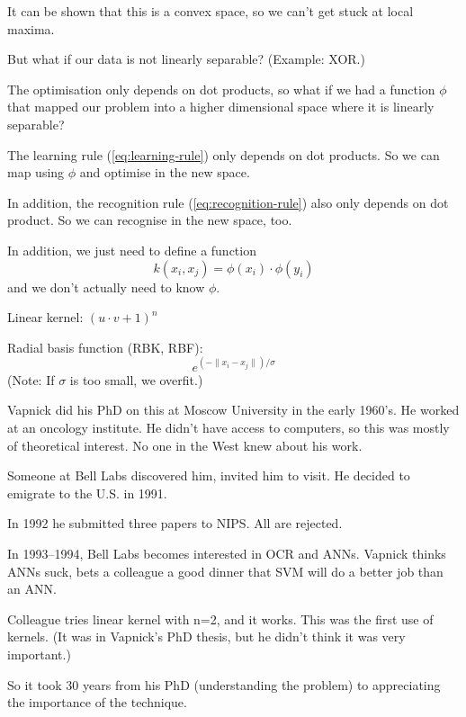 It can be shown that this is a convex space, so we can't get stuck at
local maxima.



But what if our data is not linearly separable?  (Example: XOR.)

The optimisation only depends on dot products, so what if we had a
function $\phi$ that mapped our problem into a higher dimensional
space where it is linearly separable?

The learning rule (\ref{eq:learning-rule}) only depends on dot
products.  So we can map using $\phi$ and optimise in the new space.

In addition, the recognition rule (\ref{eq:recognition-rule}) also
only depends on dot product.  So we can recognise in the new space,
too.

In addition, we just need to define a function
\begin{displaymath}
  k(x_i, x_j) = \phi(x_i)\cdot\phi(y_i)
\end{displaymath}
and we don't actually need to know $\phi$.




Linear kernel:
$(u\cdot v + 1)^n$

Radial basis function (RBK, RBF):
\begin{displaymath}
  e^{(-\parallel x_i - x_j\parallel) / \sigma}
\end{displaymath}
(Note: If $\sigma$ is too small, we overfit.)



Vapnick did his PhD on this at Moscow University in the early 1960's.
He worked at an oncology institute.  He didn't have access to
computers, so this was mostly of theoretical interest.  No one in the
West knew about his work.

Someone at Bell Labs discovered him, invited him to visit.  He decided
to emigrate to the U.S. in 1991.

In 1992 he submitted three papers to NIPS.  All are rejected.

In 1993--1994, Bell Labs becomes interested in OCR and ANNs.  Vapnick
thinks ANNs suck, bets a colleague a good dinner that SVM will do a
better job than an ANN.

Colleague tries linear kernel with n=2, and it works.  This was the
first use of kernels.  (It was in Vapnick's PhD thesis, but he didn't
think it was very important.)

So it took 30 years from his PhD (understanding the problem) to
appreciating the importance of the technique.





